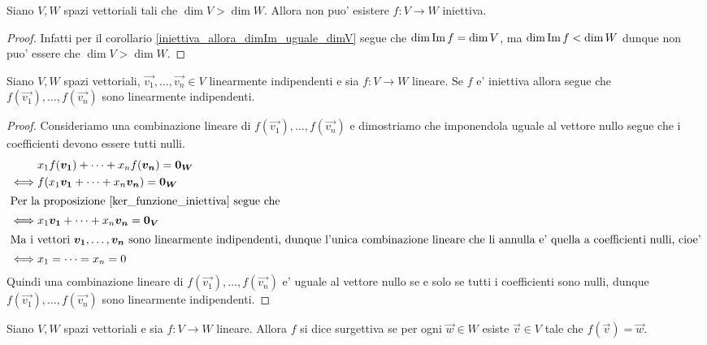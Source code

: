 \begin{corollary}
    Siano $V, W$ spazi vettoriali tali che $\dim V > \dim W$. Allora non puo' esistere $f : V \to W$ iniettiva.
\end{corollary}
\begin{proof}
    Infatti per il corollario \ref{iniettiva_allora_dimIm_uguale_dimV} segue che $\dim \Imm{f} = \dim V$, ma $\dim \Imm{f} < \dim W$ dunque non puo' essere che $\dim V > \dim W$.
\end{proof}

\begin{proposition}\label{indipendenti_mappati_indipendenti}
    Siano $V, W$ spazi vettoriali, $\vec{v_1}, \dots, \vec{v_n} \in V$ linearmente indipendenti e sia $f : V \to W$ lineare. Se $f$ e' iniettiva allora segue che $f(\vec{v_1}), \dots, f(\vec{v_n})$ sono linearmente indipendenti. 
\end{proposition}
\begin{proof}
    Consideriamo una combinazione lineare di $f(\vec{v_1}), \dots, f(\vec{v_n})$ e dimostriamo che imponendola uguale al vettore nullo segue che i coefficienti devono essere tutti nulli.
    \begin{alignat*}
        {1}
        &x_1f(\vec{v_1}) + \dots + x_nf(\vec{v_n}) = \vec{0_W}\\
        \iff &f(x_1\vec{v_1} + \dots + x_n\vec{v_n}) = \vec{0_W}\\
        \intertext{Per la proposizione \ref{ker_funzione_iniettiva} segue che}
        \iff &x_1\vec{v_1} + \dots + x_n\vec{v_n} = \vec{0_V}\\
        \intertext{Ma i vettori $\vec{v_1}, \dots, \vec{v_n}$ sono linearmente indipendenti, dunque l'unica combinazione lineare che li annulla e' quella a coefficienti nulli, cioe'}
        \iff &x_1 = \dots = x_n = 0
    \end{alignat*}
    Quindi una combinazione lineare di $f(\vec{v_1}), \dots, f(\vec{v_n})$ e' uguale al vettore nullo se e solo se tutti i coefficienti sono nulli, dunque $f(\vec{v_1}), \dots, f(\vec{v_n})$ sono linearmente indipendenti.
\end{proof}

\begin{definition}[Surgettiva]
    Siano $V, W$ spazi vettoriali e sia $f : V \to W$ lineare. Allora $f$ si dice surgettiva se per ogni $\vec{w} \in W$ esiste $\vec{v} \in V$ tale che $f(\vec{v}) = \vec{w}$.
\end{definition}

